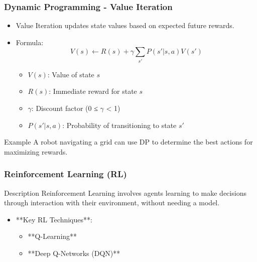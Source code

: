 \documentclass[aspectratio=169]{beamer}
\begin{document}
\begin{frame}[fragile]
    \frametitle{Dynamic Programming - Value Iteration}
    \begin{itemize}
        \item Value Iteration updates state values based on expected future rewards.
        \item Formula:
        \begin{equation}
        V(s) \gets R(s) + \gamma \sum_{s'} P(s'|s,a)V(s')
        \end{equation}
        \begin{itemize}
            \item \( V(s) \): Value of state \( s \)
            \item \( R(s) \): Immediate reward for state \( s \)
            \item \( \gamma \): Discount factor (0 ≤ \( \gamma \) < 1)
            \item \( P(s'|s,a) \): Probability of transitioning to state \( s' \)
        \end{itemize}
    \end{itemize}
    
    \begin{block}{Example}
        A robot navigating a grid can use DP to determine the best actions for maximizing rewards.
    \end{block}
\end{frame}

\begin{frame}[fragile]
    \frametitle{Reinforcement Learning (RL)}
    \begin{block}{Description}
        Reinforcement Learning involves agents learning to make decisions through interaction with their environment, without needing a model.
    \end{block}
    
    \begin{itemize}
        \item **Key RL Techniques**:
        \begin{itemize}
            \item **Q-Learning**
            \item **Deep Q-Networks (DQN)**
        \end{itemize}
    \end{itemize}
\end{frame}
\end{document}

